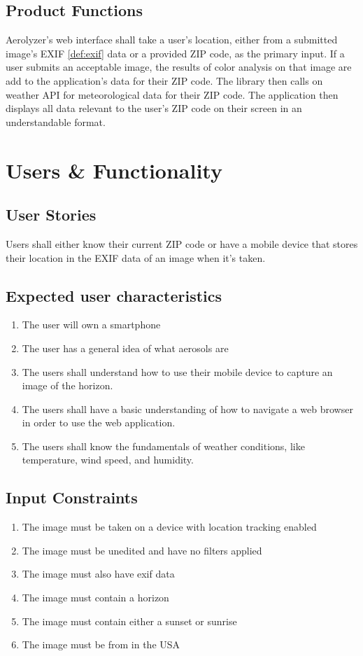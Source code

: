 \documentclass[journal,10pt,draftclsnofoot,onecolumn]{IEEEtran}
\begin{document}
\begin{singlespace}
	\subsection{Product Functions}
		Aerolyzer's web interface shall take a user's location, either from a submitted image's EXIF \ref{def:exif} data or a provided ZIP code, as the primary input.
		If a user submits an acceptable image, the results of color analysis on that image are add to the application's data for their ZIP code.
		The library then calls on weather API for meteorological data for their ZIP code.
		The application then displays all data relevant to the user's ZIP code on their screen in an understandable format.

\clearpage

\section{Users \& Functionality}
	
	\subsection{User Stories}
		Users shall either know their current ZIP code or have a mobile device that stores their location in the EXIF data of an image when it's taken.

	\subsection{Expected user characteristics}
	\begin{enumerate}
		\item The user will own a smartphone
		\item The user has a general idea of what aerosols are
		\item The users shall understand how to use their mobile device to capture an image of the horizon.
		\item The users shall have a basic understanding of how to navigate a web browser in order to use the web application.
		\item The users shall know the fundamentals of weather conditions, like temperature, wind speed, and humidity.
	\end{enumerate}

	\subsection{Input Constraints}
	\begin{enumerate}
		\item The image must be taken on a device with location tracking enabled
		\item The image must be unedited and have no filters applied
		\item The image must also have exif data
		\item The image must contain a horizon
		\item The image must contain either a sunset or sunrise
		\item The image must be from in the USA
	\end{enumerate}


\end{singlespace}
\end{document}
